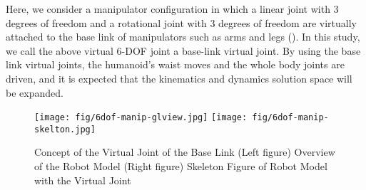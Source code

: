 Here, we consider a manipulator configuration in which a linear joint with 3 degrees of freedom and a rotational joint with 3 degrees of freedom are virtually attached to the base link of manipulators such as arms and legs ().
In this study, we call the above virtual 6-DOF joint a base-link virtual joint.
By using the base link virtual joints, the humanoid's waist moves and the whole body joints are driven, and it is expected that the kinematics and dynamics solution space will be expanded.
\begin{figure}[htb]
  \begin{center}
    \texttt{[image: fig/6dof-manip-glview.jpg]}
    \texttt{[image: fig/6dof-manip-skelton.jpg]}
    \caption{Concept of the Virtual Joint of the Base Link\newline
      (Left figure) Overview of the Robot Model\newline
      (Right figure) Skeleton Figure of Robot Model with the Virtual Joint
    }
  \end{center}
\end{figure}




